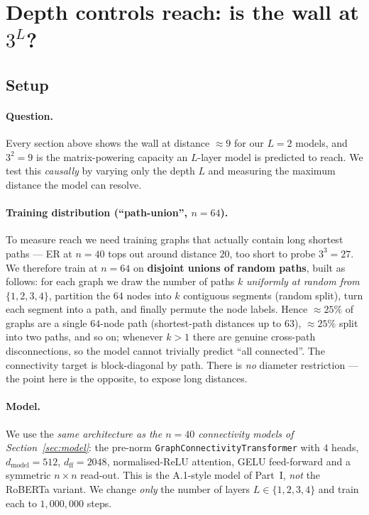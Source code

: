 \documentclass[11pt,a4paper]{article}
\begin{document}
\section{Depth controls reach: is the wall at $3^L$?}
\label{sec:reach}

\subsection{Setup}

\paragraph{Question.} Every section above shows the wall at distance $\approx 9$
for our $L = 2$ models, and $3^2 = 9$ is the matrix-powering capacity an
$L$-layer model is predicted to reach. We test this \emph{causally} by varying
only the depth $L$ and measuring the maximum distance the model can resolve.

\paragraph{Training distribution (``path-union'', $n = 64$).} To measure reach we
need training graphs that actually contain long shortest paths --- ER at $n = 40$
tops out around distance $20$, too short to probe $3^3 = 27$. We therefore train
at $n = 64$ on \textbf{disjoint unions of random paths}, built as follows: for
each graph we draw the number of paths $k$ \emph{uniformly at random from}
$\{1, 2, 3, 4\}$, partition the $64$ nodes into $k$ contiguous segments (random
split), turn each segment into a path, and finally permute the node labels.
Hence $\approx 25\%$ of graphs are a single $64$-node path (shortest-path
distances up to $63$), $\approx 25\%$ split into two paths, and so on; whenever
$k > 1$ there are genuine cross-path disconnections, so the model cannot trivially
predict ``all connected''. The connectivity target is block-diagonal by path.
There is \emph{no} diameter restriction --- the point here is the opposite, to
expose long distances.

\paragraph{Model.} We use the \emph{same architecture as the
$n = 40$ connectivity models of Section~\ref{sec:model}}: the pre-norm
\texttt{GraphConnectivityTransformer} with $4$ heads, $d_{\mathrm{model}} = 512$,
$d_{\mathrm{ff}} = 2048$, normalised-ReLU attention, GELU feed-forward and a
symmetric $n \times n$ read-out. This is the A.1-style model of Part~I, \emph{not}
the RoBERTa variant. We change \emph{only} the number of layers $L \in
\{1,2,3,4\}$ and train each to $1{,}000{,}000$ steps.
\end{document}
